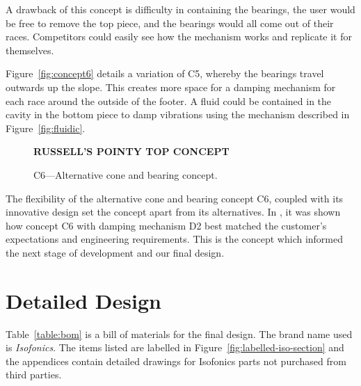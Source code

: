 \documentclass[11pt]{article}
\begin{document}
A drawback of this concept is difficulty in containing the bearings, the user 
would be free to remove the top piece, and the bearings would all come out of 
their races. Competitors could easily see how the mechanism works and replicate 
it for themselves.

Figure~\vref{fig:concept6} details a variation of C5, whereby the bearings 
travel outwards up the slope. This creates more space for a damping mechanism 
for each race around the outside of the footer. A fluid could be contained in 
the cavity in the bottom piece to damp vibrations using the mechanism described 
in Figure~\ref{fig:fluidic}.

\begin{figure}[h]
    \centering
    \textbf{RUSSELL'S POINTY TOP CONCEPT}
    \caption{C6---Alternative cone and bearing concept.}
    \label{fig:concept6}
\end{figure}
    
The flexibility of the alternative cone and bearing concept C6, coupled with 
its innovative design set the concept apart from its alternatives. In 
\cite{maguire2016vibration}, it was shown how concept C6 with damping mechanism 
D2 best matched the customer's expectations and engineering requirements. This 
is the concept which informed the next stage of development and our final 
design.
    
\section{Detailed Design}

Table~\vref{table:bom} is a bill of materials for the final design. The brand 
name used is \emph{Isofonics}. The items listed are labelled in 
Figure~\vref{fig:labelled-iso-section} and the appendices contain detailed 
drawings for Isofonics parts not purchased from third parties.
\end{document}
